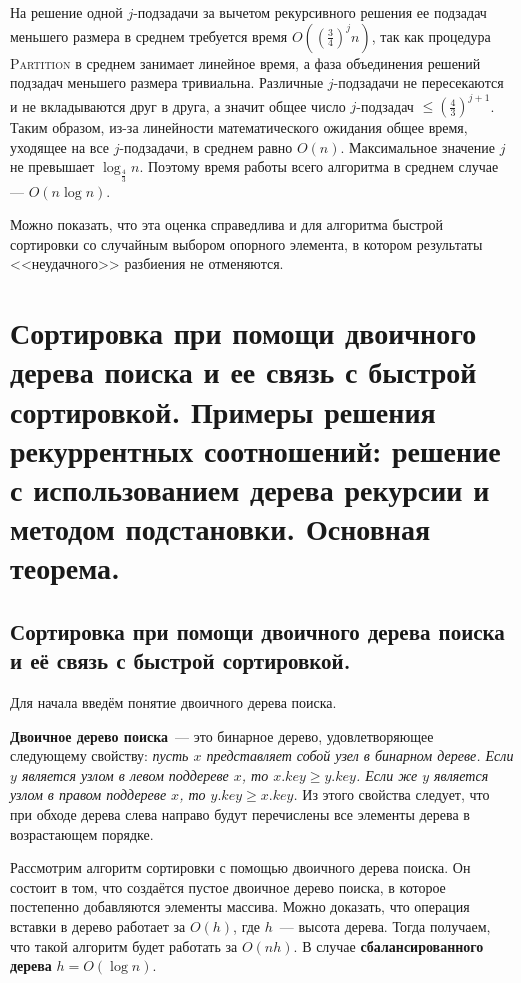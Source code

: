\documentclass[a4paper,12pt]{article}
\newcommand{\algname}[1]{\textsc{#1}}
\begin{document}
На решение одной $j$-подзадачи за вычетом рекурсивного решения ее подзадач меньшего размера в среднем требуется время $O\left(\left(\frac{3}{4}\right)^jn\right)$, так как процедура \algname{Partition} в среднем занимает линейное время, а фаза объединения решений подзадач меньшего размера тривиальна. Различные $j$-подзадачи не пересекаются и не вкладываются друг в друга, а значит общее число $j$-подзадач $\le \left(\frac{4}{3}\right)^{j+1}$. Таким образом, из-за линейности математического ожидания общее время, уходящее на все $j$-подзадачи, в среднем равно $O(n)$. Максимальное значение $j$ не превышает $\log_{\frac{4}{3}}n$. Поэтому время работы всего алгоритма в среднем случае --- $O(n\log n)$.

Можно показать, что эта оценка справедлива и для алгоритма быстрой сортировки со случайным выбором опорного элемента, в котором результаты <<неудачного>> разбиения не отменяются.
\newpage

\section{Сортировка при помощи двоичного дерева поиска и ее связь с быстрой сортировкой. Примеры решения рекуррентных соотношений: решение с использованием дерева рекурсии и методом подстановки. Основная теорема.}

\subsection{Сортировка при помощи двоичного дерева поиска и её связь с быстрой сортировкой.}
Для начала введём понятие двоичного дерева поиска.

\textbf{Двоичное дерево поиска}~--- это бинарное дерево, удовлетворяющее следующему свойству: \emph{пусть \(x\) представляет собой узел в бинарном дереве. Если \(y\) является узлом в левом поддереве \(x\), то \(x.key \geqslant y.key\). Если же \(y\) является узлом в правом поддереве \(x\), то \(y.key \geqslant x.key\).} Из этого свойства следует, что при обходе дерева слева направо будут перечислены все элементы дерева в возрастающем порядке.

Рассмотрим алгоритм сортировки с помощью двоичного дерева поиска. Он состоит в том, что создаётся пустое двоичное дерево поиска, в которое постепенно добавляются элементы массива. Можно доказать, что операция вставки в дерево работает за \(O(h)\), где \(h\)~--- высота дерева. Тогда получаем, что такой алгоритм будет работать за \(O(nh)\). В случае \textbf{сбалансированного дерева} \(h = O(\log n)\). 
\end{document}
